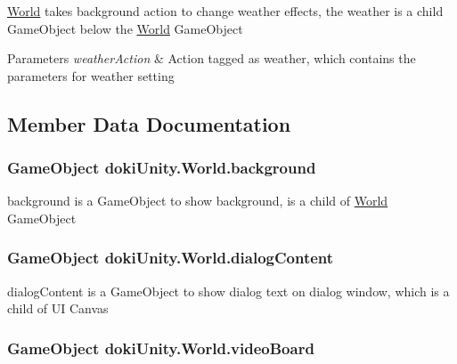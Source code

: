 \hyperlink{classdoki_unity_1_1_world}{World} takes background action to change weather effects, the weather is a child Game\+Object below the \hyperlink{classdoki_unity_1_1_world}{World} Game\+Object 


\begin{DoxyParams}{Parameters}
{\em weather\+Action} & Action tagged as weather, which contains the parameters for weather setting\\
\hline
\end{DoxyParams}


\subsection{Member Data Documentation}
\subsubsection[{\texorpdfstring{background}{background}}]{\setlength{\rightskip}{0pt plus 5cm}Game\+Object doki\+Unity.\+World.\+background}\hypertarget{classdoki_unity_1_1_world_a78f3a46c12e0272fcd356c1501fa6a86}{}\label{classdoki_unity_1_1_world_a78f3a46c12e0272fcd356c1501fa6a86}


background is a Game\+Object to show background, is a child of \hyperlink{classdoki_unity_1_1_world}{World} Game\+Object 

\subsubsection[{\texorpdfstring{dialog\+Content}{dialogContent}}]{\setlength{\rightskip}{0pt plus 5cm}Game\+Object doki\+Unity.\+World.\+dialog\+Content}\hypertarget{classdoki_unity_1_1_world_a2ced8f095679e05f01ba5781f67015e5}{}\label{classdoki_unity_1_1_world_a2ced8f095679e05f01ba5781f67015e5}


dialog\+Content is a Game\+Object to show dialog text on dialog window, which is a child of UI Canvas 

\subsubsection[{\texorpdfstring{video\+Board}{videoBoard}}]{\setlength{\rightskip}{0pt plus 5cm}Game\+Object doki\+Unity.\+World.\+video\+Board}\hypertarget{classdoki_unity_1_1_world_a5d48c7ea4c8d189f35d8ee8a5b6b320d}{}\label{classdoki_unity_1_1_world_a5d48c7ea4c8d189f35d8ee8a5b6b320d}


